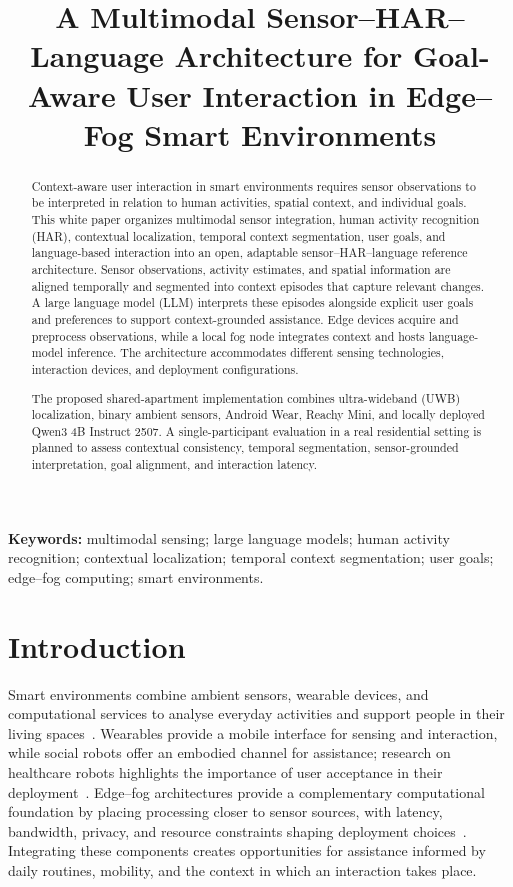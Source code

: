 \documentclass[10pt,twocolumn]{article}
\title{A Multimodal Sensor--HAR--Language Architecture for Goal-Aware User Interaction in Edge--Fog Smart Environments}
\author{}
\date{}
\begin{document}
\maketitle

\begin{abstract}
Context-aware user interaction in smart environments requires sensor observations to be interpreted in relation to human activities, spatial context, and individual goals. This white paper organizes multimodal sensor integration, human activity recognition (HAR), contextual localization, temporal context segmentation, user goals, and language-based interaction into an open, adaptable sensor--HAR--language reference architecture. Sensor observations, activity estimates, and spatial information are aligned temporally and segmented into context episodes that capture relevant changes. A large language model (LLM) interprets these episodes alongside explicit user goals and preferences to support context-grounded assistance. Edge devices acquire and preprocess observations, while a local fog node integrates context and hosts language-model inference. The architecture accommodates different sensing technologies, interaction devices, and deployment configurations.

The proposed shared-apartment implementation combines ultra-wideband (UWB) localization, binary ambient sensors, Android Wear, Reachy Mini, and locally deployed Qwen3 4B Instruct 2507. A single-participant evaluation in a real residential setting is planned to assess contextual consistency, temporal segmentation, sensor-grounded interpretation, goal alignment, and interaction latency.
\end{abstract}

\noindent\textbf{Keywords:} multimodal sensing; large language models; human activity recognition; contextual localization; temporal context segmentation; user goals; edge--fog computing; smart environments.


\section{Introduction}

Smart environments combine ambient sensors, wearable devices, and computational services to analyse everyday activities and support people in their living spaces~\cite{cook2007smart}. Wearables provide a mobile interface for sensing and interaction, while social robots offer an embodied channel for assistance; research on healthcare robots highlights the importance of user acceptance in their deployment~\cite{broadbent2009acceptance}. Edge--fog architectures provide a complementary computational foundation by placing processing closer to sensor sources, with latency, bandwidth, privacy, and resource constraints shaping deployment choices~\cite{shi2016edge}. Integrating these components creates opportunities for assistance informed by daily routines, mobility, and the context in which an interaction takes place.
\end{document}
